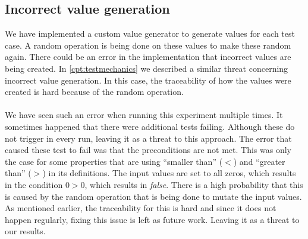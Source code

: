\subsection*{Incorrect value generation}
We have implemented a custom value generator to generate values for each test
case. A random operation is being done on these values to make
these random again. There could be an error in the implementation that incorrect
values are being created. In \autoref{cpt:testmechanics} we described a similar threat concerning incorrect value generation.
In this case, the traceability of how the values were created is hard because of the random operation.\\
\\
We have seen such an error when running this experiment multiple times. It sometimes happened that there were additional tests failing. Although these do not trigger in every run, leaving it as a threat to this approach. The error that caused these test to fail was that the preconditions are not met. This was only the case for some properties that are using ``smaller than'' ($<$) and ``greater than'' ($>$) in its definitions. The input values are set to all zeros, which results in the condition $0 > 0$, which results in \textit{false}. There is a high probability that this is caused by the random operation that is being done to mutate the input values. As mentioned earlier, the traceability for this is hard and since it does not happen regularly, fixing this issue is left as future work. Leaving it as a threat to our results.



